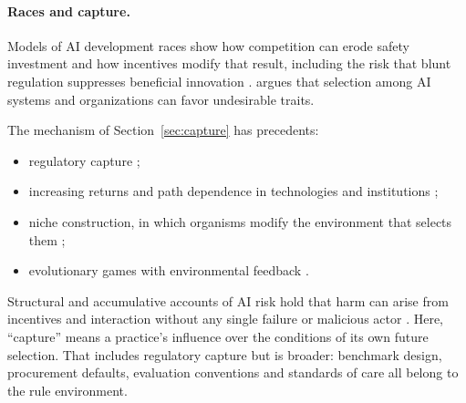 \documentclass[11pt]{article}
\theoremstyle{plain}
\theoremstyle{definition}
\begin{document}
\paragraph{Races and capture.} Models of AI development races show how competition can erode safety investment and how incentives modify that result, including the risk that blunt regulation suppresses beneficial innovation \citep{armstrong2016,han2021,cimpeanu2022}. \citet{hendrycks2023} argues that selection among AI systems and organizations can favor undesirable traits.

The mechanism of Section~\ref{sec:capture} has precedents:
\begin{itemize}[leftmargin=*]
\item regulatory capture \citep{stigler1971,dalbo2006,carpenter2013};
\item increasing returns and path dependence in technologies and institutions \citep{david1985,arthur1989,pierson2000};
\item niche construction, in which organisms modify the environment that selects them \citep{odlingsmee2003};
\item evolutionary games with environmental feedback \citep{weitz2016,tilman2020}.
\end{itemize}

Structural and accumulative accounts of AI risk hold that harm can arise from incentives and interaction without any single failure or malicious actor \citep{zwetsloot2019,critch2023,kasirzadeh2025,kulveit2025}. Here, ``capture'' means a practice's influence over the conditions of its own future selection. That includes regulatory capture but is broader: benchmark design, procurement defaults, evaluation conventions and standards of care all belong to the rule environment.
\end{document}
